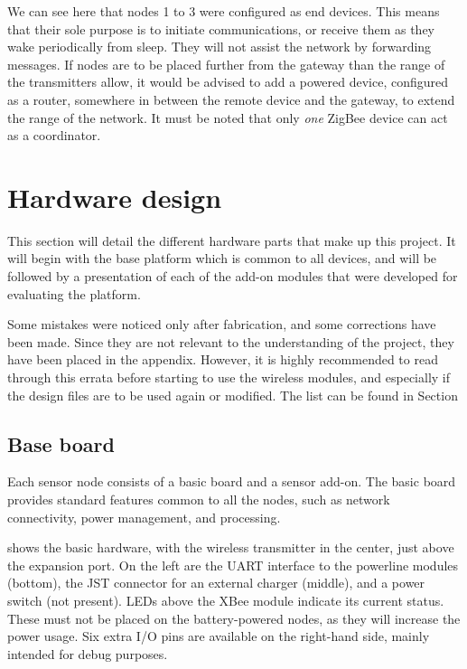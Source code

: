 We can see here that nodes 1 to 3 were configured as end devices. This means
that their sole purpose is to initiate communications, or receive them as they
wake periodically from sleep. They will not assist the network by forwarding
messages. If nodes are to be placed further from the gateway than the range of
the transmitters allow, it would be advised to add a powered device, configured
as a router, somewhere in between the remote device and the gateway, to extend
the range of the network. It must be noted that only \emph{one} ZigBee device
can act as a coordinator. 

\pagebreak
\section{Hardware design}

This section will detail the different hardware parts that make up this project. 
It will begin with the base platform which is common to all devices, and will be
followed by a presentation of each of the add-on modules that were developed for
evaluating the platform.

Some mistakes were noticed only after fabrication, and some corrections have
been made. Since they are not relevant to the understanding of the project, they
have been placed in the appendix. However, it is highly recommended to read
through this errata before starting to use the wireless modules, and especially
if the design files are to be used again or modified. The list can be found in
Section 

\subsection{Base board}

Each sensor node consists of a basic board and a sensor add-on. The basic board
provides standard features common to all the nodes, such as network
connectivity, power management, and processing.

 shows the basic hardware, with the wireless transmitter
in the center, just above the expansion port. On the left are the UART interface
to the powerline modules (bottom), the JST connector for an external charger
(middle), and a power switch (not present). LEDs above the XBee module indicate
its current status. These must not be placed on the battery-powered nodes, as
they will increase the power usage. Six extra I/O pins are available on the
right-hand side, mainly intended for debug purposes.

